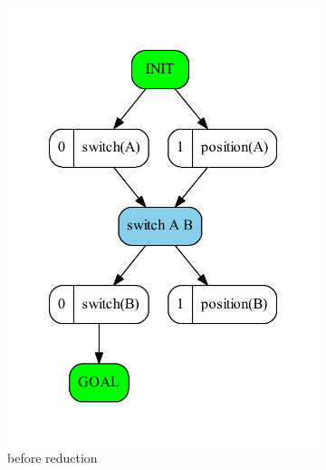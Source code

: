 	\begin{figure}
		\begin{subfigure}[b]{0.4\textwidth}
			\includegraphics[scale=0.4]{oneEffectDelete/figures/simple_input}
			\caption{before reduction}
		\end{subfigure}	
		\begin{subfigure}[b]{0.4\textwidth}

\end{subfigure}
\end{figure}
